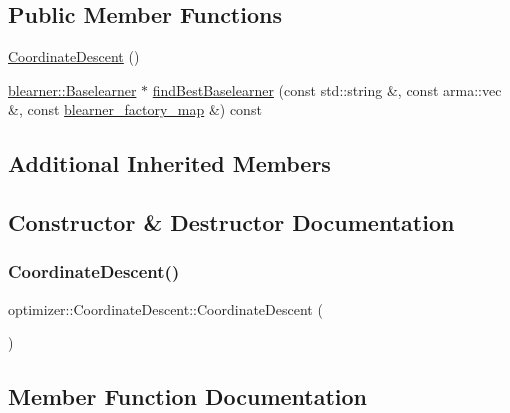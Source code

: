 \subsection*{Public Member Functions}
\begin{DoxyCompactItemize}
\item 
\hyperlink{classoptimizer_1_1_coordinate_descent_a3720beef3be4a2aac76dd1aa279b8e9a}{Coordinate\+Descent} ()
\item 
\hyperlink{classblearner_1_1_baselearner}{blearner\+::\+Baselearner} $\ast$ \hyperlink{classoptimizer_1_1_coordinate_descent_af5e8a9fb18b1f627b20534b372d62a6e}{find\+Best\+Baselearner} (const std\+::string \&, const arma\+::vec \&, const \hyperlink{baselearner__factory__list_8h_a058570e00ae11b882cfed36eb40be025}{blearner\+\_\+factory\+\_\+map} \&) const
\end{DoxyCompactItemize}
\subsection*{Additional Inherited Members}


\subsection{Constructor \& Destructor Documentation}
\mbox{\label{classoptimizer_1_1_coordinate_descent_a3720beef3be4a2aac76dd1aa279b8e9a}} 
\subsubsection{\texorpdfstring{Coordinate\+Descent()}{CoordinateDescent()}}
{\footnotesize\ttfamily optimizer\+::\+Coordinate\+Descent\+::\+Coordinate\+Descent (\begin{DoxyParamCaption}{ }\end{DoxyParamCaption})}



\subsection{Member Function Documentation}
\mbox{\label{classoptimizer_1_1_coordinate_descent_af5e8a9fb18b1f627b20534b372d62a6e}} 
